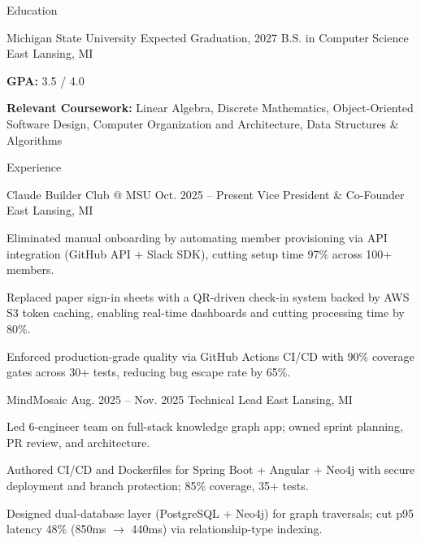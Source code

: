 \documentclass[
	11pt
]{../../../resume}
\begin{document}
	\begin{rSection}{E}{ducation}
		\begin{rSectionEntry}
			{Michigan State University}
			{Expected Graduation, 2027}
			{B.S. in Computer Science}
			{}
			{East Lansing, MI}

			\item \textbf{GPA:} 3.5 / 4.0
			\item \textbf{Relevant Coursework:} Linear Algebra, Discrete Mathematics, Object-Oriented Software Design, Computer Organization and Architecture, Data Structures \& Algorithms
		\end{rSectionEntry}
	\end{rSection}

	\begin{rSection}{E}{xperience}
		\begin{rSectionEntry}
			{Claude Builder Club @ MSU}
			{Oct. 2025 -- Present}
			{Vice President \& Co-Founder}
			{}
			{East Lansing, MI}

			\item Eliminated manual onboarding by automating member provisioning via API integration (GitHub API + Slack SDK), cutting setup time 97\% across 100+ members.
			\item Replaced paper sign-in sheets with a QR-driven check-in system backed by AWS S3 token caching, enabling real-time dashboards and cutting processing time by 80\%.
			\item Enforced production-grade quality via GitHub Actions CI/CD with 90\% coverage gates across 30+ tests, reducing bug escape rate by 65\%.
		\end{rSectionEntry}

		\begin{rSectionEntry}
			{MindMosaic}
			{Aug. 2025 -- Nov. 2025}
			{Technical Lead}
			{}
			{East Lansing, MI}

			\item Led 6-engineer team on full-stack knowledge graph app; owned sprint planning, PR review, and architecture.
			\item Authored CI/CD and Dockerfiles for Spring Boot + Angular + Neo4j with secure deployment and branch protection; 85\% coverage, 35+ tests.
			\item Designed dual-database layer (PostgreSQL + Neo4j) for graph traversals; cut p95 latency 48\% (850ms $\rightarrow$ 440ms) via relationship-type indexing.
		\end{rSectionEntry}

	\end{rSection}
\end{document}
